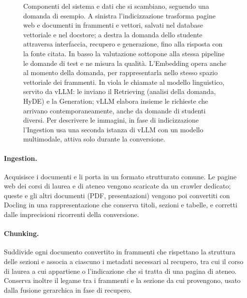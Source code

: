 \begin{figure}[H]
  \caption{Componenti del sistema e dati che si scambiano, seguendo una domanda di esempio. A sinistra
  l'indicizzazione trasforma pagine web e documenti in frammenti e vettori, salvati nel database vettoriale e nel docstore; a
  destra la domanda dello studente attraversa interfaccia, recupero e generazione, fino alla risposta con la fonte
  citata. In basso la valutazione sottopone alla stessa pipeline le domande di test e ne misura la qualità.
  L'Embedding opera anche al momento della domanda, per rappresentarla nello stesso spazio vettoriale dei
  frammenti. In viola le chiamate al modello linguistico, servito da vLLM: le inviano il Retrieving (analisi della
  domanda, HyDE) e la Generation; vLLM elabora insieme le richieste che arrivano contemporaneamente, anche da
  domande di studenti diversi. Per descrivere le immagini, in fase di indicizzazione l'Ingestion usa una seconda
  istanza di vLLM con un modello multimodale, attiva solo durante la conversione.}
  \label{fig:componenti}
\end{figure}

\paragraph{Ingestion.} Acquisisce i documenti e li porta in un formato strutturato comune. Le pagine web dei corsi
di laurea e di ateneo vengono scaricate da un crawler dedicato; queste e gli altri documenti (PDF, presentazioni)
vengono poi convertiti con Docling in una rappresentazione che conserva titoli, sezioni e tabelle, e corretti dalle
imprecisioni ricorrenti della conversione.

\paragraph{Chunking.} Suddivide ogni documento convertito in frammenti che rispettano la struttura delle sezioni e
associa a ciascuno i metadati necessari al recupero, tra cui il corso di laurea a cui appartiene o l'indicazione che
si tratta di una pagina di ateneo. Conserva inoltre il legame tra i frammenti e la sezione da cui provengono, usato
dalla fusione gerarchica in fase di recupero.

